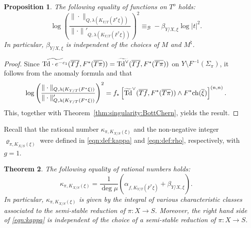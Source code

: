 \documentclass[amscd, leqno]{amsart}
\theoremstyle{plain}
\newtheorem{theorem}{Theorem}[section]
\newtheorem{proposition}[theorem]{Proposition}
\theoremstyle{definition}
\theoremstyle{remark}
\newenvironment{pf}{\begin{proof}}{\end{proof}}
\begin{document}
\begin{proposition}
\label{prop:comparison:quillen}
The following equality of functions on $T^{o}$ holds:
$$
\log \left( \frac{\|\cdot\|_{Q,\lambda( K_{Y/T}(F^{*}\xi) )}}{\|\cdot\|'_{Q,\lambda( K_{Y/T}(F^{*}\xi) )}} \right)^{2} 
\equiv_{\mathcal B} -\beta_{Y/X, \xi} \log|t|^{2}.
$$
In particular, $\beta_{Y/X, \xi}$ is independent of the choices of $M$ and $M^{\natural}$.
\end{proposition}

\begin{pf}
Since $\widetilde{{\rm Td}\cdot e^{-c_{1}}}(\overline{Tf}, F^{*}(\overline{T\pi})) = \widetilde{{\rm Td}^{\lor}}(\overline{Tf}, F^{*}(\overline{T\pi}))$
on $Y \setminus F^{-1}(\Sigma_{\pi})$, it follows from the anomaly formula 
\cite[Ths.\,0.2, 0.3]{BGS88} and \cite[I, Prop.\,1.3.1]{GilletSoule90} that
$$
\log\left(\frac{\|\cdot\|_{Q,\lambda( K_{Y/T}(F^{*}\xi) )}}{\|\cdot\|'_{Q,\lambda( K_{Y/T}(F^{*}\xi) )}}\right)^{2}
=
f_{*} \left[ \widetilde{\rm Td}^{\lor}(\overline{Tf}, F^{*}(\overline{T\pi})) \wedge F^{*}{\rm ch}( \overline{\xi} ) \right]^{(n,n)}.
$$
This, together with Theorem~\ref{thm:singularity:BottChern}, yields the result.
\end{pf}


Recall that the rational number $\kappa_{\pi, K_{X/S}(\xi)}$ and the non-negative integer $\varrho_{\pi, K_{X/S}(\xi)}$ 
were defined in \eqref{eqn:def:kappa} and \eqref{eqn:def:rho}, respectively, with $g=1$.


\begin{theorem}
\label{thm:leading:term:torsion}
The following equality of rational numbers holds:
\begin{equation}
\label{eqn:kappa}
\kappa_{\pi, K_{X/S}(\xi)} = \frac{1}{\deg\mu} \left( \alpha_{f, K_{Y/T}(F^{*}\xi)} + \beta_{Y/X, \xi } \right).
\end{equation}
In particular, $\kappa_{\pi, K_{X/S}(\xi)}$ is given by the integral of various characteristic classes associated to 
the semi-stable reduction of $\pi \colon X \to S$.
Moreover, the right hand side of \eqref{eqn:kappa} is independent of the choice of a semi-stable reduction of $\pi \colon X \to S$.
\end{theorem}
\end{document}
